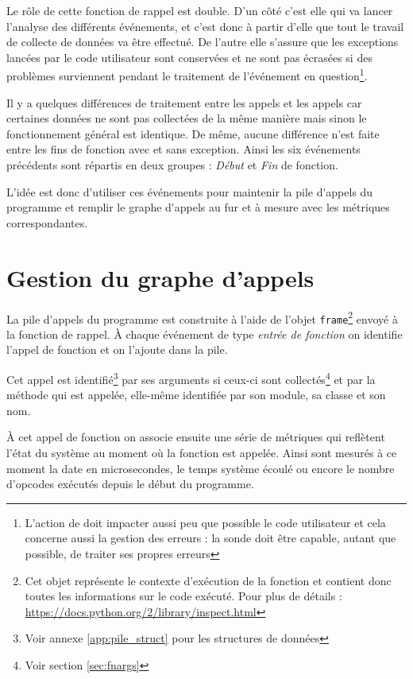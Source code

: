 Le rôle de cette fonction de rappel est double. D'un côté c'est elle qui va lancer l'analyse des différents événements, et c'est donc à partir d'elle que tout le travail de collecte de données va être effectué. De l'autre elle s'assure que les exceptions lancées par le code utilisateur sont conservées et ne sont pas écrasées si des problèmes surviennent pendant le traitement de l'événement en question\footnote{L'action de \Blackfire doit impacter aussi peu que possible le code utilisateur et cela concerne aussi la gestion des erreurs : la sonde doit être capable, autant que possible, de traiter ses propres erreurs}.

Il y a quelques différences de traitement entre les appels \C et les appels \Python car certaines données ne sont pas collectées de la même manière mais sinon le fonctionnement général est identique. De même, aucune différence n'est faite entre les fins de fonction avec et sans exception. Ainsi les six événements précédents sont répartis en deux groupes : \emph{Début} et \emph{Fin} de fonction.

L'idée est donc d'utiliser ces événements pour maintenir la \gls{pile d'appels} du programme et remplir le \gls{graphe d'appels} au fur et à mesure avec les métriques correspondantes.

  \section{Gestion du graphe d'appels}
  \label{sec:gestion-graph-appels}
La \gls{pile d'appels} du programme est construite à l'aide de l'objet \verb|frame|\footnote{Cet objet représente le contexte d'exécution de la fonction et contient donc toutes les informations sur le code exécuté. Pour plus de détails : \url{https://docs.python.org/2/library/inspect.html}} envoyé à la fonction de rappel. À chaque événement de type \emph{entrée de fonction} on identifie l'appel de fonction et on l'ajoute dans la pile.
  
Cet appel est identifié\footnote{Voir annexe \vref{app:pile_struct} pour les structures de données} par ses arguments si ceux-ci sont collectés\footnote{Voir section \vref{sec:fnargs}} et par la méthode qui est appelée, elle-même identifiée par son module, sa classe et son nom. 

À cet appel de fonction on associe ensuite une série de métriques qui reflètent l'état du système au moment où la fonction est appelée. Ainsi sont mesurés à ce moment la date en microsecondes, le temps système écoulé ou encore le nombre d'opcodes exécutés depuis le début du programme.

